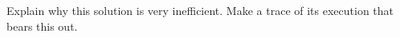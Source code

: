   Explain why this solution is very inefficient. Make a trace of its
  execution that bears this out.
